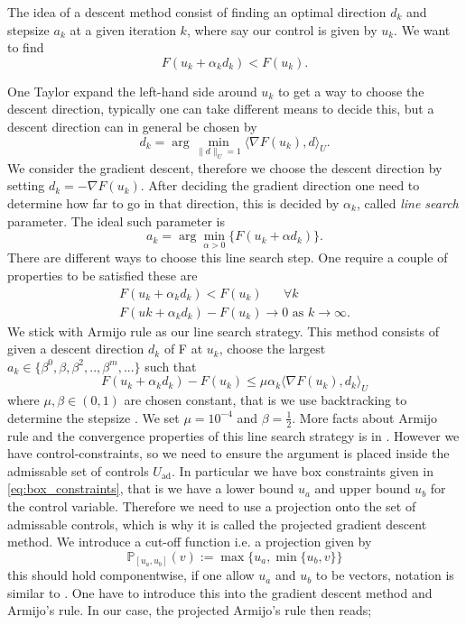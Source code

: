 The idea of a descent method consist of finding an optimal direction $d_k$ and stepsize $a_k$ at a given iteration $k$, where say our control is given by $u_k$. We want to find
\begin{equation*}
    F(u_k + \alpha_kd_k) < F(u_k).
\end{equation*}

One Taylor expand the left-hand side around $u_k$ to get a way to choose the descent direction, typically one can take different means to decide this, but a descent direction can in general be chosen by 
\begin{equation*}
    d_k = \arg\min_{\|d\|_U=1} \langle \nabla F(u_k), d \rangle_U.
\end{equation*}
We consider the gradient descent, therefore we choose the descent direction by setting $d_k = -\nabla F(u_k)$. After deciding the gradient direction one need to determine how far to go in that direction, this is decided by $\alpha_k$, called \textit{line search} parameter. The ideal such parameter is 
\begin{equation*}
    a_k = \arg \min_{\alpha>0} \{ F(u_k + \alpha d_k) \}.
\end{equation*}
There are different ways to choose this line search step. One require a couple of properties to be satisfied these are
\begin{align*}
    F(u_k + \alpha_kd_k) < F(u_k) \text{  } \quad\forall k \\
    F(uk + \alpha_k d_k) - F(u_k) \rightarrow 0 \text{ as } k\rightarrow \infty.
\end{align*}
We stick with Armijo rule as our line search strategy. This method consists of given a descent direction $d_k$ of F at $u_k$, choose the largest $a_k \in \{ \beta^0, \beta, \beta^2,..,\beta^m,... \}$ such that
\begin{equation}\label{eq:armijo}
    F (u_k + \alpha_kd_k) - F(u_k) \leq \mu \alpha_k \langle \nabla F(u_k),d_k \rangle_{U}
\end{equation}
where $\mu,\beta  \in (0,1)$ are chosen constant, that is we use backtracking to determine the stepsize \cite{iterativeMethods}. We set $\mu = 10^{-4}$ and $\beta = \frac{1}{2}$. More facts about Armijo rule and the convergence properties of this line search strategy is in \cite{numMethods} \cite{iterativeMethods}. However we have control-constraints, so we need to ensure the argument is placed inside the admissable set of controls $U_{\textrm{ad}}$. In particular we have box constraints given in \eqref{eq:box_constraints}, that is we have a lower bound $u_a$ and upper bound $u_b$ for the control variable. Therefore we need to use a projection onto the set of admissable controls, which is why it is called the projected gradient descent method. We introduce a cut-off function i.e. a projection given by
\begin{equation}
    \label{eq:projection}
    \mathbb{P}_{[u_a,u_b]}(v) := \max \{u_a, \min \{u_b,v \} \}
\end{equation}
this should hold componentwise, if one allow $u_a$ and $u_b$ to be vectors, notation is similar to \cite{Algorithms}. One have to introduce this into the gradient descent method and Armijo's rule. In our case, the projected Armijo's rule then reads; 

